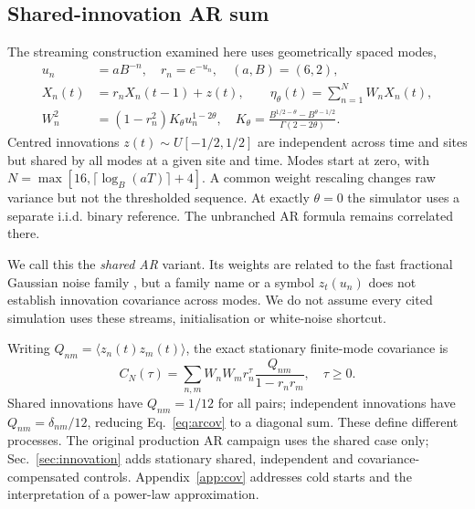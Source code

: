 \subsection{Shared-innovation AR sum}
The streaming construction examined here uses geometrically spaced modes,
\begin{align}
 u_n&=aB^{-n},\quad r_n=e^{-u_n},\quad(a,B)=(6,2),\\
 X_n(t)&=r_nX_n(t-1)+z(t),\qquad\eta_\theta(t)=\sum_{n=1}^NW_nX_n(t),\\
 W_n^2&=(1-r_n^2)K_\theta u_n^{1-2\theta},\quad
 K_\theta=\frac{B^{1/2-\theta}-B^{\theta-1/2}}{\Gamma(2-2\theta)}.
 \label{eq:ar}
\end{align}
Centred innovations $z(t)\sim U[-1/2,1/2]$ are independent across time and
sites but shared by all modes at a given site and time. Modes start at zero,
with $N=\max[16,\lceil\log_B(aT)\rceil+4]$. A common weight rescaling changes
raw variance but not the thresholded sequence. At exactly $\theta=0$ the
simulator uses a separate i.i.d. binary reference. The unbranched AR formula
remains correlated there.

We call this the \emph{shared AR} variant. Its weights are related to the
fast fractional Gaussian noise family \cite{Mandelbrot1971}, but a family name
or a symbol $z_t(u_n)$ does not establish innovation covariance across modes.
We do not assume every cited simulation uses these streams, initialisation or
white-noise shortcut.

Writing $Q_{nm}=\langle z_n(t)z_m(t)\rangle$, the exact stationary finite-mode
covariance is
\begin{equation}
 C_N(\tau)=\sum_{n,m}W_nW_mr_n^\tau\frac{Q_{nm}}{1-r_nr_m},\quad\tau\ge0.
 \label{eq:arcov}
\end{equation}
Shared innovations have $Q_{nm}=1/12$ for all pairs; independent innovations
have $Q_{nm}=\delta_{nm}/12$, reducing Eq.~\eqref{eq:arcov} to a diagonal sum.
These define different processes. The original production AR campaign uses
the shared case only; Sec.~\ref{sec:innovation} adds stationary shared,
independent and covariance-compensated controls. Appendix~\ref{app:cov}
addresses cold starts and the interpretation of a power-law approximation.

